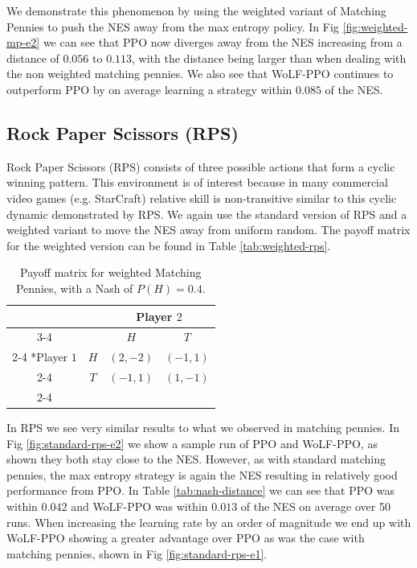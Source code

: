 \documentclass[conference]{IEEEtran}
\begin{document}
We demonstrate this phenomenon by using the weighted variant of Matching Pennies to push the NES away from the max entropy policy. In Fig \ref{fig:weighted-mp-e2} we can see that PPO now diverges away from the NES increasing from a distance of $0.056$ to $0.113$, with the distance being larger than when dealing with the non weighted matching pennies. We also see that WoLF-PPO continues to outperform PPO by on average learning a strategy within $0.085$ of the NES.

\subsection{Rock Paper Scissors (RPS)}

Rock Paper Scissors (RPS) consists of three possible actions that form a cyclic winning pattern. This environment is of interest because in many commercial video games (e.g. StarCraft\cite{balduzzi2019open}) relative skill is non-transitive similar to this cyclic dynamic demonstrated by RPS. We again use the standard version of RPS and a weighted variant to move the NES away from uniform random. The payoff matrix for the weighted version can be found in Table \ref{tab:weighted-rps}.

\begin{table}[!ht]
    \centering
    \setlength{\extrarowheight}{2pt}
    \caption{Payoff matrix for weighted Matching Pennies, with a Nash of $P(H)=0.4$.}
    \begin{tabular}{*{4}{c|}}
      \multicolumn{2}{c}{} & \multicolumn{2}{c}{Player $2$}\\\cline{3-4}
      \multicolumn{1}{c}{} &  & $H$  & $T$ \\\cline{2-4}
      \multirow{2}*{Player $1$}  & $H$ & $(2,-2)$ & $(-1,1)$ \\\cline{2-4}
      & $T$ & $(-1,1)$ & $(1,-1)$ \\\cline{2-4}
    \end{tabular}
    \label{tab:weighted-mp}
\end{table}

In RPS we see very similar results to what we observed in matching pennies. In Fig \ref{fig:standard-rps-e2} we show a sample run of PPO and WoLF-PPO, as shown they both stay close to the NES. However, as with standard matching pennies, the max entropy strategy is again the NES resulting in relatively good performance from PPO. In Table \ref{tab:nash-distance} we can see that PPO was within $0.042$ and WoLF-PPO was within $0.013$ of the NES on average over 50 runs. When increasing the learning rate by an order of magnitude we end up with WoLF-PPO showing a greater advantage over PPO as was the case with matching pennies, shown in Fig \ref{fig:standard-rps-e1}.
\end{document}
